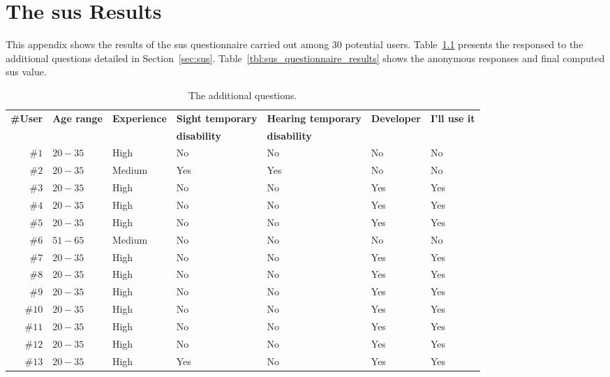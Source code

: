 
\chapter{The \ac{sus} Results}
\label{cha:appendixC}
 
This appendix shows the results of the \ac{sus} questionnaire carried out among
30 potential users. Table~\ref{tbl:additional_questions} presents the responsed 
to the additional questions detailed in Section~\ref{sec:sus}.
Table~\ref{tbl:sus_questionnaire_results} shows the anonymous responses and final
computed \ac{sus} value.

\begin{table}
  \caption{The additional questions.}
 \label{tbl:additional_questions}
\footnotesize
\centering
 \begin{tabular}{r l l l l l l}
  \hline 
  \textbf{\#User} & \textbf{Age range} & \textbf{Experience} & \textbf{Sight temporary} & \textbf{Hearing temporary} & \textbf{Developer} & \textbf{I'll use it} \\
		  &   & 			   & \textbf{disability}      & \textbf{disability}	\\
  \hline
  $\#1$ & $20-35$ 	     & High		   & No			      & No			   & No			& No	\\
  $\#2$ & $20-35$ 	     & Medium		   & Yes		      & Yes			   & No			& No	\\
  $\#3$ & $20-35$ 	     & High		   & No			      & No			   & Yes		& Yes	\\
  $\#4$ & $20-35$ 	     & High		   & No			      & No			   & Yes		& Yes	\\
  $\#5$ & $20-35$ 	     & High		   & No			      & No			   & Yes		& Yes	\\
  $\#6$ & $51-65$ 	     & Medium		   & No			      & No			   & No			& No	\\
  $\#7$ & $20-35$ 	     & High		   & No			      & No			   & Yes		& Yes	\\
  $\#8$ & $20-35$ 	     & High		   & No			      & No			   & Yes		& Yes	\\
  $\#9$ & $20-35$ 	     & High		   & No			      & No			   & Yes		& Yes	\\
  $\#10$ & $20-35$ 	     & High		   & No			      & No			   & Yes		& Yes	\\
  $\#11$ & $20-35$ 	     & High		   & No			      & No			   & Yes		& Yes	\\
  $\#12$ & $20-35$ 	     & High		   & No			      & No			   & Yes		& Yes	\\
  $\#13$ & $20-35$ 	     & High		   & Yes		      & No			   & Yes		& Yes	\\

\end{tabular}
\end{table}
